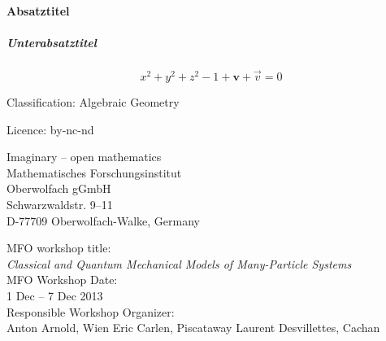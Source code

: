 \paragraph{Absatztitel}\blindtext[1]
\subparagraph{Unterabsatztitel}\blindtext[1]
\begin{equation}
x^2+y^2+z^2-1+\mathbf{v}+\vec{v}=0
\end{equation}
\blindtext

\null\vfill
\noindent\begin{minipage}[b]{0.5\linewidth}
\raggedright
\arial
{}
\footnotesize
Classification: Algebraic Geometry

Licence: by-nc-nd
\bigskip

Imaginary -- open mathematics\\
Mathematisches Forschungsinstitut\\
Oberwolfach gGmbH\\
Schwarzwaldstr. 9--11\\
D-77709 Oberwolfach-Walke, Germany
\end{minipage}%
\hspace{1ex}
\begin{minipage}[b]{0.45\linewidth}%
\raggedright
\arial
{}
\footnotesize
MFO workshop title:\\
\textit{Classical and Quantum Mechanical Models of Many-Particle Systems}
\\[\medskipamount]

MFO Workshop Date:\\
1 Dec -- 7 Dec 2013
\\[\medskipamount]

Responsible Workshop Organizer:\\
Anton Arnold, Wien
Eric Carlen, Piscataway
Laurent Desvillettes, Cachan
\end{minipage}

%
